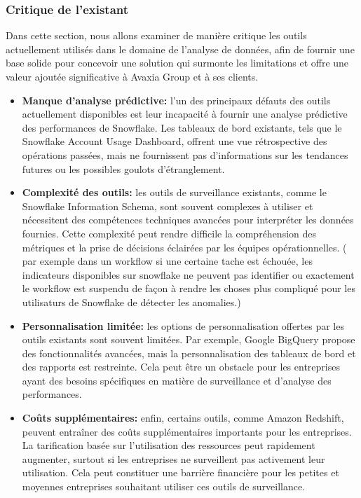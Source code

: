 \subsubsection{Critique de l'existant}
\par Dans cette section, nous allons examiner de manière critique les outils actuellement utilisés dans le domaine de l'analyse de données, afin de fournir une base solide pour concevoir une solution qui surmonte les limitations et offre une valeur ajoutée significative à Avaxia Group et à ses clients.
\begin{itemize}
    \item\textbf{Manque d'analyse prédictive: }l'un des principaux défauts des outils actuellement disponibles est leur incapacité à fournir une analyse prédictive des performances de Snowflake. 
    Les tableaux de bord existants, tels que le Snowflake Account Usage Dashboard, offrent une vue rétrospective des opérations passées, mais ne fournissent pas d'informations sur les tendances futures ou les possibles goulots d'étranglement.

    \item\textbf{Complexité des outils: }les outils de surveillance existants, comme le Snowflake Information Schema, sont souvent complexes à utiliser et nécessitent des compétences techniques avancées pour interpréter les données fournies. 
    Cette complexité peut rendre difficile la compréhension des métriques et la prise de décisions éclairées par les équipes opérationnelles.
    ( par exemple dans un workflow si une certaine tache est échouée, les indicateurs disponibles sur snowflake ne peuvent pas identifier ou exactement le workflow est suspendu de façon à rendre les choses plus compliqué pour les utilisaturs de Snowflake de détecter les anomalies.)

    \item\textbf{Personnalisation limitée: }les options de personnalisation offertes par les outils existants sont souvent limitées. 
    Par exemple, Google BigQuery propose des fonctionnalités avancées, mais la personnalisation des tableaux de bord et des rapports est restreinte. Cela peut être un obstacle pour les entreprises ayant des besoins spécifiques en matière de surveillance et d'analyse des performances.

    \item\textbf{Coûts supplémentaires: } enfin, certains outils, comme Amazon Redshift, peuvent entraîner des coûts supplémentaires importants pour les entreprises. La tarification basée sur l'utilisation des ressources peut rapidement augmenter, surtout si les entreprises ne surveillent pas activement leur utilisation. Cela peut constituer une barrière financière pour les petites et moyennes entreprises souhaitant utiliser ces outils de surveillance.


\end{itemize}
